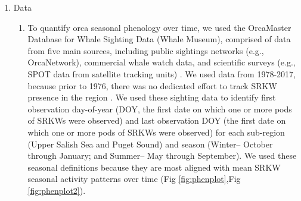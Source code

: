 \documentclass{article}
\begin{document}
\begin{enumerate}
\item Data
\begin{enumerate}
\item To quantify orca seasonal phenology over time, we used the OrcaMaster Database for Whale Sighting Data (Whale Museum), comprised of data from five main sources, including public sightings networks (e.g., OrcaNetwork), commercial whale watch data, and scientific surveys (e.g., SPOT data from satellite tracking units) \citep{olson2018}. We used data from 1978-2017, because prior to 1976, there was no dedicated effort to track SRKW presence in the region \citep{olson2018}. We used these sighting data to identify first observation day-of-year (DOY, the first date on which one or more pods of SRKWs were observed) and last observation DOY (the first date on which one or more pods of SRKWs were observed) for each sub-region (Upper Salish Sea and Puget Sound) and season (Winter-- October through January; and Summer-- May through September). We used these seasonal definitions because they are most aligned with mean SRKW seasonal activity patterns over time (Fig \ref{fig:phenplot},Fig \ref{fig:phenplot2}).



\end{enumerate}
\end{enumerate}
\end{document}
